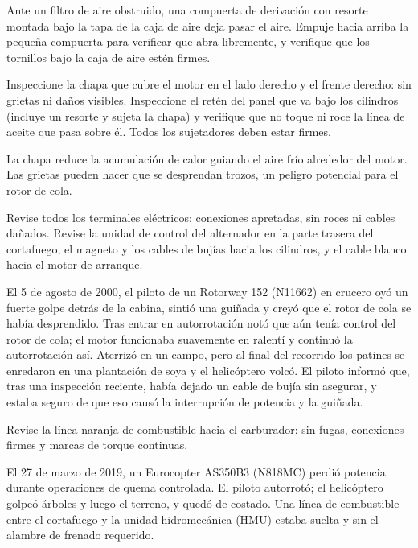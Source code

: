 \begin{nota}
Ante un filtro de aire obstruido, una compuerta de derivación con resorte montada bajo la tapa de la caja de aire deja pasar el aire. Empuje hacia arriba la pequeña compuerta para verificar que abra libremente, y verifique que los tornillos bajo la caja de aire estén firmes.
\end{nota}

Inspeccione la chapa que cubre el motor en el lado derecho y el frente derecho: sin grietas ni daños visibles. Inspeccione el retén del panel que va bajo los cilindros (incluye un resorte y sujeta la chapa) y verifique que no toque ni roce la línea de aceite que pasa sobre él. Todos los sujetadores deben estar firmes.

\begin{nota}
La chapa reduce la acumulación de calor guiando el aire frío alrededor del motor. Las grietas pueden hacer que se desprendan trozos, un peligro potencial para el rotor de cola.
\end{nota}

Revise todos los terminales eléctricos: conexiones apretadas, sin roces ni cables dañados. Revise la unidad de control del alternador en la parte trasera del cortafuego, el magneto y los cables de bujías hacia los cilindros, y el cable blanco hacia el motor de arranque.

\begin{caso}
El 5 de agosto de 2000, el piloto de un Rotorway 152 (N11662) en crucero oyó un fuerte golpe detrás de la cabina, sintió una guiñada y creyó que el rotor de cola se había desprendido. Tras entrar en autorrotación notó que aún tenía control del rotor de cola; el motor funcionaba suavemente en ralentí y continuó la autorrotación así. Aterrizó en un campo, pero al final del recorrido los patines se enredaron en una plantación de soya y el helicóptero volcó. El piloto informó que, tras una inspección reciente, había dejado un cable de bujía sin asegurar, y estaba seguro de que eso causó la interrupción de potencia y la guiñada.
\end{caso}

Revise la línea naranja de combustible hacia el carburador: sin fugas, conexiones firmes y marcas de torque continuas.

\begin{caso}
El 27 de marzo de 2019, un Eurocopter AS350B3 (N818MC) perdió potencia durante operaciones de quema controlada. El piloto autorrotó; el helicóptero golpeó árboles y luego el terreno, y quedó de costado. Una línea de combustible entre el cortafuego y la unidad hidromecánica (HMU) estaba suelta y sin el alambre de frenado requerido.
\end{caso}

